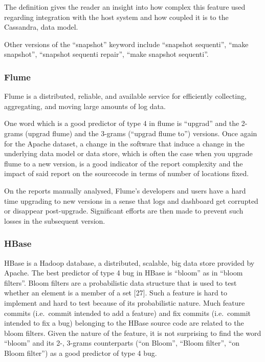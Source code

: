 \documentclass[12pt]{report}
\begin{document}
The definition gives the reader an insight into how complex this feature
used regarding integration with the host system and how coupled it is to
the Cassandra, data model.

Other versions of the ``snapshot'' keyword include ``snapshot
sequenti'', ``make snapshot'', ``snapshot sequenti repair'', ``make
snapshot sequenti''.

\subsubsection{Flume}\label{flume}

Flume is a distributed, reliable, and available service for efficiently
collecting, aggregating, and moving large amounts of log data.

One word which is a good predictor of type 4 in flume is ``upgrad'' and
the 2-grams (upgrad flume) and the 3-grams (``upgrad flume to'')
versions. Once again for the Apache dataset, a change in the software
that induce a change in the underlying data model or data store, which
is often the case when you upgrade flume to a new version, is a good
indicator of the report complexity and the impact of said report on the
sourcecode in terms of number of locations fixed.

On the reports manually analysed, Flume's developers and users have a
hard time upgrading to new versions in a sense that logs and dashboard
get corrupted or disappear post-upgrade. Significant efforts are then
made to prevent such losses in the subsequent version.

\subsubsection{HBase}\label{hbase}

HBase is a Hadoop database, a distributed, scalable, big data store
provided by Apache. The best predictor of type 4 bug in HBase is
``bloom'' as in ``bloom filters''. Bloom filters are a probabilistic
data structure that is used to test whether an element is a member of a
set {[}27{]}. Such a feature is hard to implement and hard to test
because of its probabilistic nature. Much feature commits (i.e.~commit
intended to add a feature) and fix commits (i.e.~commit intended to fix
a bug) belonging to the HBase source code are related to the bloom
filters. Given the nature of the feature, it is not surprising to find
the word ``bloom'' and its 2-, 3-grams counterparts (``on Bloom'',
``Bloom filter'', ``on Bloom filter'') as a good predictor of type 4
bug.
\end{document}
